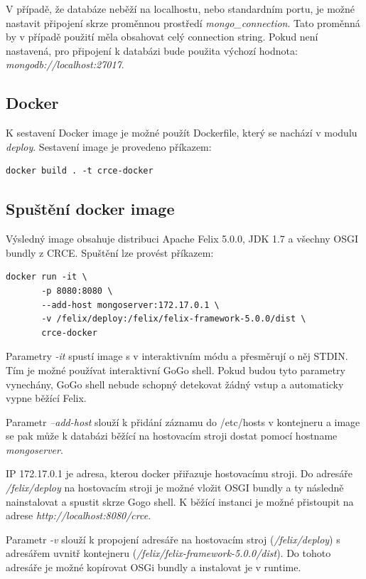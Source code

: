 \documentclass[12pt, a4paper]{article}
\begin{document}
V případě, že databáze neběží na localhostu, nebo standardním portu, je možné nastavit připojení skrze proměnnou prostředí \textit{mongo\_connection}. Tato proměnná by v případě použití měla obsahovat celý connection string. Pokud není nastavená, pro připojení k databázi bude použita výchozí hodnota: \textit{mongodb://localhost:27017}.

\subsection{Docker}
K sestavení Docker image je možné použít Dockerfile, který se nachází v modulu \textit{deploy}. Sestavení image je provedeno příkazem:

\begin{verbatim}
docker build . -t crce-docker
\end{verbatim} 

\subsection{Spuštění docker image}

Výsledný image obsahuje distribuci Apache Felix 5.0.0, JDK 1.7 a všechny OSGI bundly z CRCE. Spuštění lze provést příkazem:

\begin{verbatim}
docker run -it \ 
	   -p 8080:8080 \
	   --add-host mongoserver:172.17.0.1 \
	   -v /felix/deploy:/felix/felix-framework-5.0.0/dist \
	   crce-docker 
\end{verbatim}

Parametry \textit{-it} spustí image s v interaktivním módu a přesměrují o něj STDIN. Tím je možné používat interaktivní GoGo shell. Pokud budou tyto parametry vynechány, GoGo shell nebude schopný detekovat žádný vstup a automaticky vypne běžící Felix.

Parametr \textit{--add-host} slouží k přidání záznamu do /etc/hosts v kontejneru a image se pak může k databázi běžící na hostovacím stroji dostat pomocí hostname \textit{mongoserver}. 

IP 172.17.0.1 je adresa, kterou docker přiřazuje hostovacímu stroji. Do adresáře \textit{/felix/deploy} na hostovacím stroji je možné vložit OSGI bundly a ty následně nainstalovat a spustit skrze Gogo shell. K běžící instanci je možné přistoupit na adrese \textit{http://localhost:8080/crce}. 

Parametr \textit{-v} slouží k propojení adresáře na hostovacím stroj (\textit{/felix/deploy}) s adresářem uvnitř kontejneru (\textit{/felix/felix-framework-5.0.0/dist}). Do tohoto adresáře je možné kopírovat OSGi bundly a instalovat je v runtime.
\end{document}
